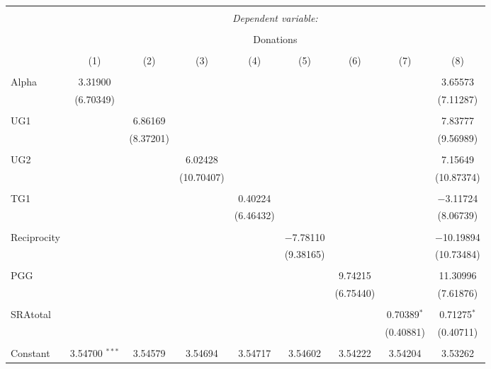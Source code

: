 \documentclass[12pt]{article}
\begin{document}
\begin{table}[!htbp] \centering 
  \caption{} 
  \label{} 
          \begin{adjustbox}{width=\textwidth}
\begin{tabular}{@{\extracolsep{5pt}}lcccccccc} 
\\[-1.8ex]\hline 
\hline \\[-1.8ex] 
 & \multicolumn{8}{c}{\textit{Dependent variable:}} \\ 
\cline{2-9} 
\\[-1.8ex] & \multicolumn{8}{c}{Donations} \\ 
\\[-1.8ex] & (1) & (2) & (3) & (4) & (5) & (6) & (7) & (8)\\ 
\hline \\[-1.8ex] 
 Alpha & 3.31900 &  &  &  &  &  &  & 3.65573 \\ 
  & (6.70349) &  &  &  &  &  &  & (7.11287) \\ 
  & & & & & & & & \\ 
 UG1 &  & 6.86169 &  &  &  &  &  & 7.83777 \\ 
  &  & (8.37201) &  &  &  &  &  & (9.56989) \\ 
  & & & & & & & & \\ 
 UG2 &  &  & 6.02428 &  &  &  &  & 7.15649 \\ 
  &  &  & (10.70407) &  &  &  &  & (10.87374) \\ 
  & & & & & & & & \\ 
 TG1 &  &  &  & 0.40224 &  &  &  & $-$3.11724 \\ 
  &  &  &  & (6.46432) &  &  &  & (8.06739) \\ 
  & & & & & & & & \\ 
 Reciprocity &  &  &  &  & $-$7.78110 &  &  & $-$10.19894 \\ 
  &  &  &  &  & (9.38165) &  &  & (10.73484) \\ 
  & & & & & & & & \\ 
 PGG &  &  &  &  &  & 9.74215 &  & 11.30996 \\ 
  &  &  &  &  &  & (6.75440) &  & (7.61876) \\ 
  & & & & & & & & \\ 
 SRAtotal &  &  &  &  &  &  & 0.70389$^{*}$ & 0.71275$^{*}$ \\ 
  &  &  &  &  &  &  & (0.40881) & (0.40711) \\ 
  & & & & & & & & \\ 
 Constant & 3.54700 $^{***}$ & 3.54579 & 3.54694 & 3.54717 & 3.54602 & 3.54222 & 3.54204 & 3.53262 \\ 

\end{tabular}
\end{adjustbox}
\end{table}
\end{document}

